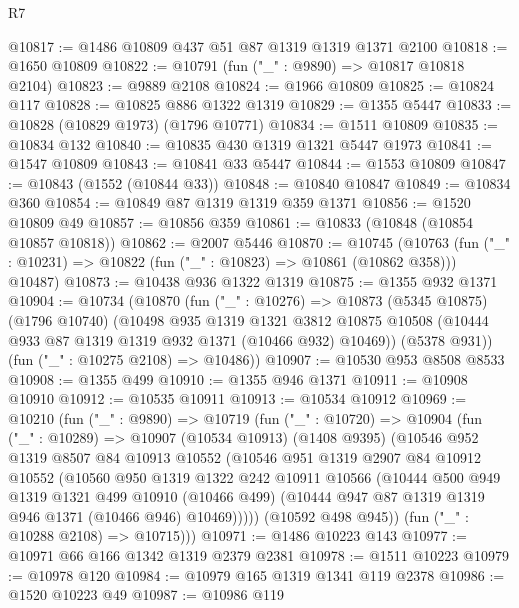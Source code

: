 \begin{lexlean}{R7}
\begin{coremodule}
@10817 := @1486 @10809 @437 @51 @87 @1319 @1319 @1371 @2100
@10818 := @1650 @10809
@10822 := @10791 (fun ("_" : @9890) => @10817 @10818 @2104)
@10823 := @9889 @2108
@10824 := @1966 @10809
@10825 := @10824 @117
@10828 := @10825 @886 @1322 @1319
@10829 := @1355 @5447
@10833 := @10828 (@10829 @1973) (@1796 @10771)
@10834 := @1511 @10809
@10835 := @10834 @132
@10840 := @10835 @430 @1319 @1321 @5447 @1973
@10841 := @1547 @10809
@10843 := @10841 @33 @5447
@10844 := @1553 @10809
@10847 := @10843 (@1552 (@10844 @33))
@10848 := @10840 @10847
@10849 := @10834 @360
@10854 := @10849 @87 @1319 @1319 @359 @1371
@10856 := @1520 @10809 @49
@10857 := @10856 @359
@10861 := @10833 (@10848 (@10854 @10857 @10818))
@10862 := @2007 @5446
@10870 := @10745
    (@10763 (fun ("_" : @10231) => @10822 (fun ("_" : @10823) => @10861 (@10862 @358))) @10487)
@10873 := @10438 @936 @1322 @1319
@10875 := @1355 @932 @1371
@10904 := @10734
    (@10870
      (fun ("_" : @10276) =>
      @10873
        (@5345 @10875)
        (@1796 @10740)
        (@10498
          @935
          @1319
          @1321
          @3812
          @10875
          @10508
          (@10444 @933 @87 @1319 @1319 @932 @1371 (@10466 @932) @10469))
        (@5378 @931))
      (fun ("_" : @10275 @2108) => @10486))
@10907 := @10530 @953 @8508 @8533
@10908 := @1355 @499
@10910 := @1355 @946 @1371
@10911 := @10908 @10910
@10912 := @10535 @10911
@10913 := @10534 @10912
@10969 := @10210
    (fun ("_" : @9890) =>
    @10719
      (fun ("_" : @10720) =>
      @10904
        (fun ("_" : @10289) =>
        @10907
          (@10534 @10913)
          (@1408 @9395)
          (@10546
            @952
            @1319
            @8507
            @84
            @10913
            @10552
            (@10546
              @951
              @1319
              @2907
              @84
              @10912
              @10552
              (@10560
                @950
                @1319
                @1322
                @242
                @10911
                @10566
                (@10444
                  @500
                  @949
                  @1319
                  @1321
                  @499
                  @10910
                  (@10466 @499)
                  (@10444 @947 @87 @1319 @1319 @946 @1371 (@10466 @946) @10469)))))
          (@10592 @498 @945))
        (fun ("_" : @10288 @2108) => @10715)))
@10971 := @1486 @10223 @143
@10977 := @10971 @66 @166 @1342 @1319 @2379 @2381
@10978 := @1511 @10223
@10979 := @10978 @120
@10984 := @10979 @165 @1319 @1341 @119 @2378
@10986 := @1520 @10223 @49
@10987 := @10986 @119

\end{coremodule}
\end{lexlean}
